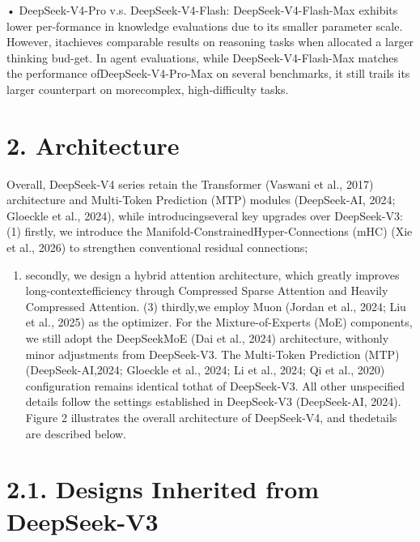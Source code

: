 \documentclass[
  10
]{article}
\providecommand{\tightlist}{%
  \setlength{\itemsep}{0pt}\setlength{\parskip}{0pt}}
\begin{document}
• DeepSeek-V4-Pro v.s. DeepSeek-V4-Flash: DeepSeek-V4-Flash-Max exhibits
lower per-formance in knowledge evaluations due to its smaller parameter
scale. However, itachieves comparable results on reasoning tasks when
allocated a larger thinking bud-get. In agent evaluations, while
DeepSeek-V4-Flash-Max matches the performance ofDeepSeek-V4-Pro-Max on
several benchmarks, it still trails its larger counterpart on
morecomplex, high-difficulty tasks.

\section{2. Architecture}\label{architecture}

Overall, DeepSeek-V4 series retain the Transformer (Vaswani et al.,
2017) architecture and Multi-Token Prediction (MTP) modules
(DeepSeek-AI, 2024; Gloeckle et al., 2024), while introducingseveral key
upgrades over DeepSeek-V3: (1) firstly, we introduce the
Manifold-ConstrainedHyper-Connections (mHC) (Xie et al., 2026) to
strengthen conventional residual connections;

\begin{enumerate}
\def\labelenumi{(\arabic{enumi})}
\setcounter{enumi}{1}
\tightlist
\item
  secondly, we design a hybrid attention architecture, which greatly
  improves long-contextefficiency through Compressed Sparse Attention
  and Heavily Compressed Attention. (3) thirdly,we employ Muon (Jordan
  et al., 2024; Liu et al., 2025) as the optimizer. For the
  Mixture-of-Experts (MoE) components, we still adopt the DeepSeekMoE
  (Dai et al., 2024) architecture, withonly minor adjustments from
  DeepSeek-V3. The Multi-Token Prediction (MTP) (DeepSeek-AI,2024;
  Gloeckle et al., 2024; Li et al., 2024; Qi et al., 2020) configuration
  remains identical tothat of DeepSeek-V3. All other unspecified details
  follow the settings established in DeepSeek-V3 (DeepSeek-AI, 2024).
  Figure 2 illustrates the overall architecture of DeepSeek-V4, and
  thedetails are described below.
\end{enumerate}

\section{2.1. Designs Inherited from
DeepSeek-V3}\label{designs-inherited-from-deepseek-v3}
\end{document}
